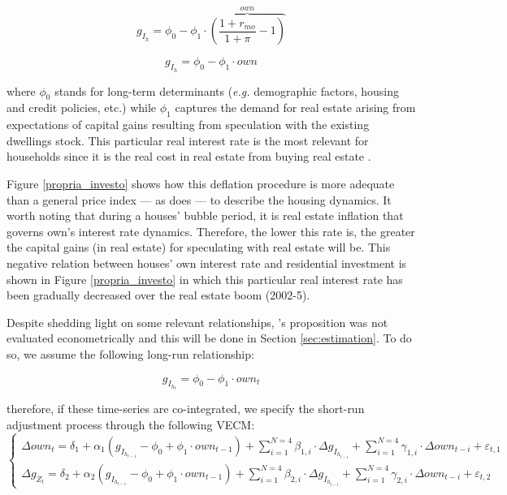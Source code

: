 \documentclass[12pt, a4paper]{article}
\begin{document}
$$
g_{I_h} = \phi_0 - \phi_1\cdot \overbrace{\left(\frac{1+r_{mo}}{1+\pi} - 1\right)}^{own}
$$

\begin{equation}
g_{I_h} = \phi_0 - \phi_1\cdot own
\end{equation}

where \(\phi_0\) stands for long-term determinants (\emph{e.g.} demographic factors, housing and credit policies, etc.) while \(\phi_1\) captures the demand for real estate arising from expectations of capital gains resulting from speculation with the existing dwellings stock. 
This particular real interest rate is the most relevant for households since it is the real cost in real estate from buying real estate  \cite[p.~53]{teixeira_crescimento_2015}.

Figure \ref{propria_investo} shows how this deflation procedure is more adequate than a general price index --- as \textcite[p.~143--6]{fair_macroeconometric_2013} does --- to describe the housing dynamics. It worth noting that during a houses' bubble period, it is real estate inflation that governs own's interest rate dynamics.
Therefore, the lower this rate is, the greater the capital gains (in real estate) for speculating with real estate will be. This negative relation between houses' own interest rate and residential investment is shown in Figure \ref{propria_investo} in which this particular real interest rate has been gradually decreased over the real estate boom (2002-5).

Despite shedding light on some relevant relationships, \citeauthor*{teixeira_crescimento_2015}'s \citeyear{teixeira_crescimento_2015} proposition was not evaluated econometrically and this will be done in Section \ref{sec:estimation}. To do so, we assume the following long-run relationship:

\begin{equation}
g_{I_{h_{t}}} = \phi_0 - \phi_1\cdot own_t
\end{equation}

therefore, if these time-series are co-integrated, we specify the short-run adjustment process through the following VECM:
\begin{equation}
\begin{cases}
\Delta own_t = \delta_{1} + \alpha_1\left(g_{I_{h_{t-1}}} - \phi_0 + \phi_1\cdot own_{t-1}\right) + {\sum^{N=4}_{i=1}}\beta_{1,i}\cdot \Delta g_{I_{h_{t-i}}} +
\sum^{N=4}_{i=1}\gamma_{1,i}\cdot \Delta own_{t-i} +\varepsilon_{t,1}
\\
\Delta g_{Z_{t}} = \delta_{2} + \alpha_2\left(g_{I_{h_{t-1}}} - \phi_0 + \phi_1\cdot own_{t-1}\right) + \sum^{N=4}_{i=1}\beta_{2,i}\cdot \Delta g_{I_{h_{t-i}}} +
\sum^{N=4}_{i=1}\gamma_{2,i}\cdot \Delta own_{t-i} +\varepsilon_{t,2}
\end{cases}
\end{equation}
\end{document}
